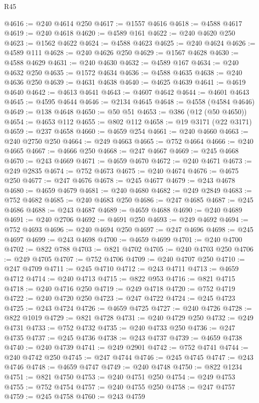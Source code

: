 \begin{lexlean}{R45}
\begin{coremodule}
{@4616 := @240 @4614 @250
@4617 := @1557 @4616
@4618 := @4588 @4617
@4619 := @240 @4618
@4620 := @4589 @161
@4622 := @240 @4620 @250
@4623 := @1562 @4622
@4624 := @4588 @4623
@4625 := @240 @4624
@4626 := @4589 @111
@4628 := @240 @4626 @250
@4629 := @1567 @4628
@4630 := @4588 @4629
@4631 := @240 @4630
@4632 := @4589 @167
@4634 := @240 @4632 @250
@4635 := @1572 @4634
@4636 := @4588 @4635
@4638 := @240 @4636 @250
@4639 := @4631 @4638
@4640 := @4625 @4639
@4641 := @4619 @4640
@4642 := @4613 @4641
@4643 := @4607 @4642
@4644 := @4601 @4643
@4645 := @4595 @4644
@4646 := @2134 @4645
@4648 := @4558 (@4584 @4646)
@4649 := @138 @4648
@4650 := @50 @51
@4653 := @386 (@12 (@50 @4650))
@4654 := @4653 @112
@4655 := @802 @112
@4658 := @19 @3171 (@22 @3171)
@4659 := @237 @4658
@4660 := @4659 @254
@4661 := @240 @4660
@4663 := @240 @2750 @250
@4664 := @249 @4663
@4665 := @752 @4664
@4666 := @240 @4665
@4667 := @4666 @250
@4668 := @247 @4667
@4669 := @245 @4668
@4670 := @243 @4669
@4671 := @4659 @4670
@4672 := @240 @4671
@4673 := @249 @2835
@4674 := @752 @4673
@4675 := @240 @4674
@4676 := @4675 @250
@4677 := @247 @4676
@4678 := @245 @4677
@4679 := @243 @4678
@4680 := @4659 @4679
@4681 := @240 @4680
@4682 := @249 @2849
@4683 := @752 @4682
@4685 := @240 @4683 @250
@4686 := @247 @4685
@4687 := @245 @4686
@4688 := @243 @4687
@4689 := @4659 @4688
@4690 := @240 @4689
@4691 := @240 @2706
@4692 := @4691 @250
@4693 := @249 @4692
@4694 := @752 @4693
@4696 := @240 @4694 @250
@4697 := @247 @4696
@4698 := @245 @4697
@4699 := @243 @4698
@4700 := @4659 @4699
@4701 := @240 @4700
@4702 := @822 @788
@4703 := @821 @4702
@4705 := @240 @4703 @250
@4706 := @249 @4705
@4707 := @752 @4706
@4709 := @240 @4707 @250
@4710 := @247 @4709
@4711 := @245 @4710
@4712 := @243 @4711
@4713 := @4659 @4712
@4714 := @240 @4713
@4715 := @822 @953
@4716 := @821 @4715
@4718 := @240 @4716 @250
@4719 := @249 @4718
@4720 := @752 @4719
@4722 := @240 @4720 @250
@4723 := @247 @4722
@4724 := @245 @4723
@4725 := @243 @4724
@4726 := @4659 @4725
@4727 := @240 @4726
@4728 := @822 @1019
@4729 := @821 @4728
@4731 := @240 @4729 @250
@4732 := @249 @4731
@4733 := @752 @4732
@4735 := @240 @4733 @250
@4736 := @247 @4735
@4737 := @245 @4736
@4738 := @243 @4737
@4739 := @4659 @4738
@4740 := @240 @4739
@4741 := @249 @2901
@4742 := @752 @4741
@4744 := @240 @4742 @250
@4745 := @247 @4744
@4746 := @245 @4745
@4747 := @243 @4746
@4748 := @4659 @4747
@4749 := @240 @4748
@4750 := @822 @1234
@4751 := @821 @4750
@4753 := @240 @4751 @250
@4754 := @249 @4753
@4755 := @752 @4754
@4757 := @240 @4755 @250
@4758 := @247 @4757
@4759 := @245 @4758
@4760 := @243 @4759
}
\end{coremodule}
\end{lexlean}
